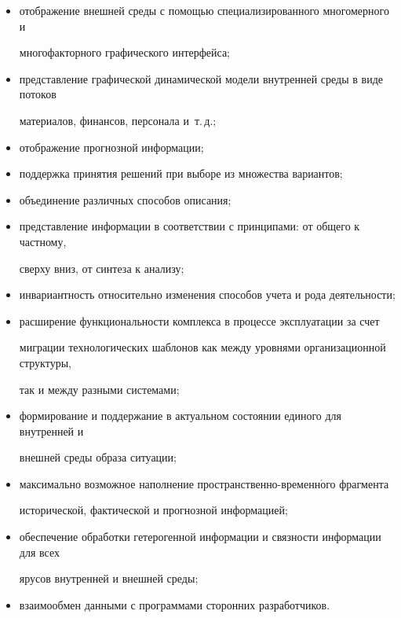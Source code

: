   \begin{itemize}


\item отображение внешней среды с помощью специализированного многомерного и 


многофакторного графического интерфейса; 


\item представление графической динамической модели внутренней среды в виде потоков 


материалов, финансов, персонала и~т.\,д.; 


\item отображение прогнозной информации; 


\item поддержка принятия решений при выборе из множества вариантов; 


\item объединение различных способов описания; 


\item представление информации в соответствии с принципами: от общего к частному, 


сверху вниз, от синтеза к анализу; 


\item инвариантность относительно изменения способов учета и рода деятельности; 


\item расширение функциональности комплекса в процессе эксплуатации за счет 


миграции технологических шаблонов как между уровнями организационной структуры, 


так и между разными сис\-те\-мами; 


\item формирование и поддержание в актуальном состоянии единого для внутренней и 


внешней среды образа ситуации; 


\item максимально возможное наполнение про\-стран\-ст\-вен\-но-временн$\acute{\mbox{о}}$го фрагмента 


исторической, фактической и прогнозной информацией; 


\item обеспечение обработки гетерогенной информации и связности информации для всех 


ярусов внутренней и внешней среды; 


\item взаимообмен данными с программами сторонних разработчиков. 


\end{itemize}





